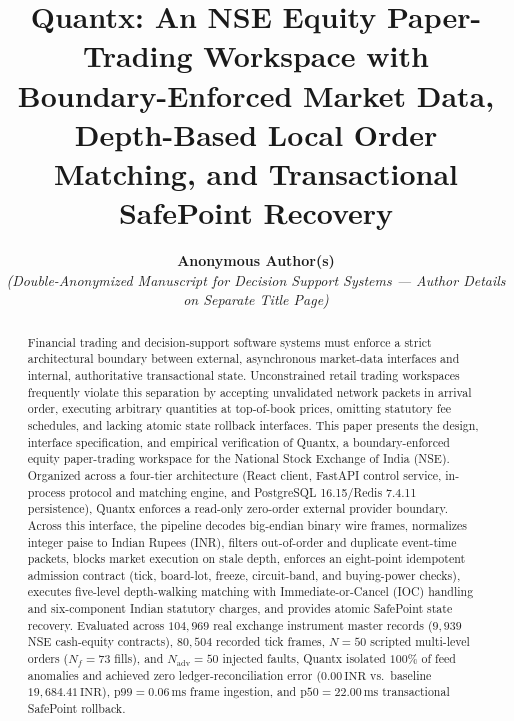 \documentclass[12pt]{article}
\newcommand{\thinunit}[2]{#1\,\text{#2}}
\begin{document}
\title{Quantx: An NSE Equity Paper-Trading Workspace with Boundary-Enforced Market Data, Depth-Based Local Order Matching, and Transactional SafePoint Recovery}

\author{\textbf{Anonymous Author(s)}\\
\small\textit{(Double-Anonymized Manuscript for Decision Support Systems --- Author Details on Separate Title Page)}}
\date{}

\maketitle

\begin{abstract}
Financial trading and decision-support software systems must enforce a strict architectural boundary between external, asynchronous market-data interfaces and internal, authoritative transactional state. Unconstrained retail trading workspaces frequently violate this separation by accepting unvalidated network packets in arrival order, executing arbitrary quantities at top-of-book prices, omitting statutory fee schedules, and lacking atomic state rollback interfaces. This paper presents the design, interface specification, and empirical verification of Quantx, a boundary-enforced equity paper-trading workspace for the National Stock Exchange of India (NSE). Organized across a four-tier architecture (React client, FastAPI control service, in-process protocol and matching engine, and PostgreSQL 16.15/Redis 7.4.11 persistence), Quantx enforces a read-only zero-order external provider boundary. Across this interface, the pipeline decodes big-endian binary wire frames, normalizes integer paise to Indian Rupees (INR), filters out-of-order and duplicate event-time packets, blocks market execution on stale depth, enforces an eight-point idempotent admission contract (tick, board-lot, freeze, circuit-band, and buying-power checks), executes five-level depth-walking matching with Immediate-or-Cancel (IOC) handling and six-component Indian statutory charges, and provides atomic SafePoint state recovery. Evaluated across $104{,}969$ real exchange instrument master records ($9{,}939$ NSE cash-equity contracts), $80{,}504$ recorded tick frames, $N=50$ scripted multi-level orders ($N_f=73$ fills), and $N_{\mathrm{adv}}=50$ injected faults, Quantx isolated $100\%$ of feed anomalies and achieved zero ledger-reconciliation error ($\thinunit{0.00}{INR}$ vs.\ baseline $\thinunit{19{,}684.41}{INR}$), $\text{p99}=\thinunit{0.06}{ms}$ frame ingestion, and $\text{p50}=\thinunit{22.00}{ms}$ transactional SafePoint rollback.
\end{abstract}
\end{document}
